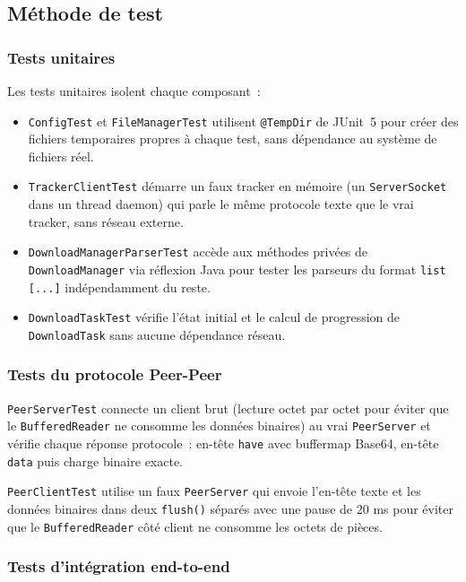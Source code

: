 \documentclass[11pt, a4paper]{article}
\begin{document}
\subsection{Méthode de test}

\subsubsection{Tests unitaires}

Les tests unitaires isolent chaque composant~:

\begin{itemize}[nosep]
    \item \texttt{ConfigTest} et \texttt{FileManagerTest} utilisent
          \texttt{@TempDir} de JUnit~5 pour créer des fichiers temporaires
          propres à chaque test, sans dépendance au système de fichiers réel.
    \item \texttt{TrackerClientTest} démarre un faux tracker en mémoire
          (un \texttt{ServerSocket} dans un thread daemon) qui parle
          le même protocole texte que le vrai tracker, sans réseau externe.
    \item \texttt{DownloadManagerParserTest} accède aux méthodes privées
          de \texttt{DownloadManager} via réflexion Java pour tester les
          parseurs du format \texttt{list [...]} indépendamment du reste.
    \item \texttt{DownloadTaskTest} vérifie l'état initial et le calcul
          de progression de \texttt{DownloadTask} sans aucune dépendance réseau.
\end{itemize}

\subsubsection{Tests du protocole Peer-Peer}

\texttt{PeerServerTest} connecte un client brut (lecture octet par octet
pour éviter que le \texttt{BufferedReader} ne consomme les données binaires)
au vrai \texttt{PeerServer} et vérifie chaque réponse protocole~:
en-tête \texttt{have} avec buffermap Base64, en-tête \texttt{data} puis
charge binaire exacte.

\texttt{PeerClientTest} utilise un faux \texttt{PeerServer} qui envoie
l'en-tête texte et les données binaires dans deux \texttt{flush()} séparés avec une pause de 20 ms pour éviter que le \texttt{BufferedReader} côté
client ne consomme les octets de pièces.

\subsubsection{Tests d'intégration end-to-end}
\end{document}
